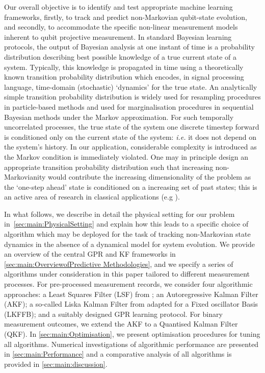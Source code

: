 \documentclass[pra, reprint]{revtex4-1}
\begin{document}
Our overall objective is to identify and test appropriate machine learning frameworks, firstly, to track and predict non-Markovian qubit-state evolution, and secondly, to accommodate the specific non-linear measurement models inherent to qubit projective measurement. In standard Bayesian learning protocols, the output of Bayesian analysis at one instant of time is a probability distribution describing best possible knowledge of a true current state of a system. Typically, this knowledge is propagated in time using a theoretically known transition probability distribution which encodes, in signal processing language, time-domain (stochastic) `dynamics' for the true state. An analytically simple transition probability distribution is widely used for resampling procedures in particle-based methods and used for marginalisation procedures in sequential Bayesian methods \cite{candy2016bayesian} under the Markov approximation.  For such temporally uncorrelated processes, the true state of the system one discrete timestep forward is conditioned only on the current state of the system: \emph{i.e.} it does not depend on the system's history.   In our application, considerable complexity is introduced as the Markov condition is immediately violated. One may in principle design an appropriate transition probability distribution such that increasing non-Markovianity would contribute the increasing dimensionality of the problem as the `one-step ahead' state is conditioned on a increasing set of past states; this is an active area of research in classical applications (e.g  \cite{jacob2017bayesian}).  

In what follows, we describe in detail the physical setting for our problem in~\cref{sec:main:PhysicalSetting} and explain how this leads to a specific choice of algorithm which may be deployed for the task of tracking non-Markovian state dynamics in the absence of a dynamical model for system evolution.  We provide an overview of the central GPR and KF frameworks in \cref{sec:main:OverviewofPredictive Methodologies}, and we specify a series of algorithms under consideration in this paper tailored to different measurement processes. For pre-processed measurement records, we consider four algorithmic approaches: a Least Squares Filter (LSF) from \cite{mavadia2017}; an Autoregressive Kalman Filter (AKF); a so-called Liska Kalman Filter from \cite{livska2007} adapted for a Fixed oscillator Basis (LKFFB); and a suitably designed GPR learning protocol. For binary measurement outcomes, we extend the AKF to a Quantised Kalman Filter (QKF). In \cref{sec:main:Optimisation}, we present optimisation procedures for tuning all algorithms. Numerical investigations of algorithmic performance are presented in \cref{sec:main:Performance} and a comparative analysis of all algorithms is provided in \cref{sec:main:discussion}. 
\end{document}
